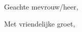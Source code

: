 \documentclass[dutch]{uuletter2}
\date{}
\begin{document}
\opening{Geachte mevrouw/heer,}

\lipsum

\closing[prof. dr. A.B.C. Zonnebloem]{Met vriendelijke groet,}
\end{document}
